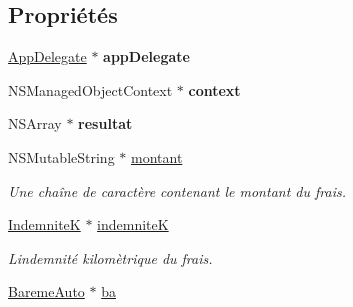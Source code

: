 \subsection*{Propriétés}
\begin{DoxyCompactItemize}
\item 
\hypertarget{interface_indemnites_table_view_controller_a661b58c51235b729a5e9e10b2f7d6b9f}{}\hyperlink{interface_app_delegate}{App\+Delegate} $\ast$ {\bfseries app\+Delegate}\label{interface_indemnites_table_view_controller_a661b58c51235b729a5e9e10b2f7d6b9f}

\item 
\hypertarget{interface_indemnites_table_view_controller_aa1db71c0b4aee77256bc3963cccf8b19}{}N\+S\+Managed\+Object\+Context $\ast$ {\bfseries context}\label{interface_indemnites_table_view_controller_aa1db71c0b4aee77256bc3963cccf8b19}

\item 
\hypertarget{interface_indemnites_table_view_controller_a84aae1becbefe67f2fa143dbc66737bc}{}N\+S\+Array $\ast$ {\bfseries resultat}\label{interface_indemnites_table_view_controller_a84aae1becbefe67f2fa143dbc66737bc}

\item 
\hypertarget{interface_indemnites_table_view_controller_ac4295cc503e091aa8af96d6b5d718a85}{}N\+S\+Mutable\+String $\ast$ \hyperlink{interface_indemnites_table_view_controller_ac4295cc503e091aa8af96d6b5d718a85}{montant}\label{interface_indemnites_table_view_controller_ac4295cc503e091aa8af96d6b5d718a85}

\begin{DoxyCompactList}\small\item\em Une chaîne de caractère contenant le montant du frais. \end{DoxyCompactList}\item 
\hypertarget{interface_indemnites_table_view_controller_a6a1a3affbcd06a4ff8a18b686ff02231}{}\hyperlink{interface_indemnite_k}{Indemnite\+K} $\ast$ \hyperlink{interface_indemnites_table_view_controller_a6a1a3affbcd06a4ff8a18b686ff02231}{indemnite\+K}\label{interface_indemnites_table_view_controller_a6a1a3affbcd06a4ff8a18b686ff02231}

\begin{DoxyCompactList}\small\item\em L\textquotesingle{}indemnité kilomètrique du frais. \end{DoxyCompactList}\item 
\hypertarget{interface_indemnites_table_view_controller_a17b467389213aa5bbfb1a4c3ce88d906}{}\hyperlink{interface_bareme_auto}{Bareme\+Auto} $\ast$ \hyperlink{interface_indemnites_table_view_controller_a17b467389213aa5bbfb1a4c3ce88d906}{ba}\label{interface_indemnites_table_view_controller_a17b467389213aa5bbfb1a4c3ce88d906}


\end{DoxyCompactItemize}
